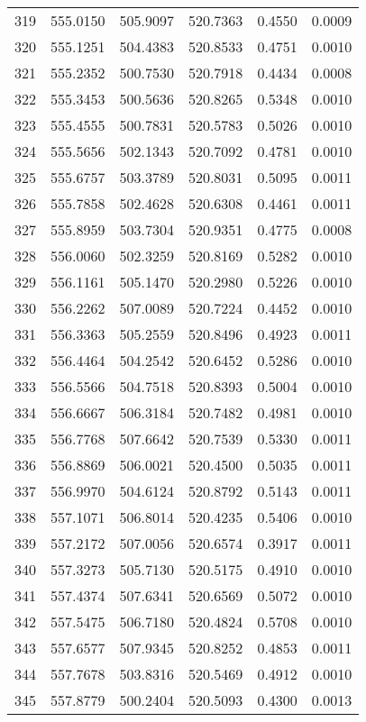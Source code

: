 \documentclass{article}
\begin{document}
\begin{longtable}{|c|c|c|c|c|c|}
319 & 555.0150 & 505.9097 & 520.7363 & 0.4550 & 0.0009 \\
320 & 555.1251 & 504.4383 & 520.8533 & 0.4751 & 0.0010 \\
321 & 555.2352 & 500.7530 & 520.7918 & 0.4434 & 0.0008 \\
322 & 555.3453 & 500.5636 & 520.8265 & 0.5348 & 0.0010 \\
323 & 555.4555 & 500.7831 & 520.5783 & 0.5026 & 0.0010 \\
324 & 555.5656 & 502.1343 & 520.7092 & 0.4781 & 0.0010 \\
325 & 555.6757 & 503.3789 & 520.8031 & 0.5095 & 0.0011 \\
326 & 555.7858 & 502.4628 & 520.6308 & 0.4461 & 0.0011 \\
327 & 555.8959 & 503.7304 & 520.9351 & 0.4775 & 0.0008 \\
328 & 556.0060 & 502.3259 & 520.8169 & 0.5282 & 0.0010 \\
329 & 556.1161 & 505.1470 & 520.2980 & 0.5226 & 0.0010 \\
330 & 556.2262 & 507.0089 & 520.7224 & 0.4452 & 0.0010 \\
331 & 556.3363 & 505.2559 & 520.8496 & 0.4923 & 0.0011 \\
332 & 556.4464 & 504.2542 & 520.6452 & 0.5286 & 0.0010 \\
333 & 556.5566 & 504.7518 & 520.8393 & 0.5004 & 0.0010 \\
334 & 556.6667 & 506.3184 & 520.7482 & 0.4981 & 0.0010 \\
335 & 556.7768 & 507.6642 & 520.7539 & 0.5330 & 0.0011 \\
336 & 556.8869 & 506.0021 & 520.4500 & 0.5035 & 0.0011 \\
337 & 556.9970 & 504.6124 & 520.8792 & 0.5143 & 0.0011 \\
338 & 557.1071 & 506.8014 & 520.4235 & 0.5406 & 0.0010 \\
339 & 557.2172 & 507.0056 & 520.6574 & 0.3917 & 0.0011 \\
340 & 557.3273 & 505.7130 & 520.5175 & 0.4910 & 0.0010 \\
341 & 557.4374 & 507.6341 & 520.6569 & 0.5072 & 0.0010 \\
342 & 557.5475 & 506.7180 & 520.4824 & 0.5708 & 0.0010 \\
343 & 557.6577 & 507.9345 & 520.8252 & 0.4853 & 0.0011 \\
344 & 557.7678 & 503.8316 & 520.5469 & 0.4912 & 0.0010 \\
345 & 557.8779 & 500.2404 & 520.5093 & 0.4300 & 0.0013 \\

\end{longtable}
\end{document}
